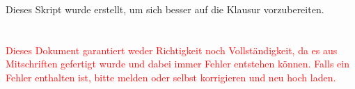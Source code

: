 Dieses Skript wurde erstellt, um sich besser auf die Klausur vorzubereiten.\\
\qquad\\
\qquad\\
\textcolor{red}{\Large{Dieses Dokument garantiert weder Richtigkeit noch Vollständigkeit, da es aus Mitschriften gefertigt wurde und dabei immer Fehler entstehen können. Falls ein Fehler enthalten ist, bitte melden oder selbst korrigieren und neu hoch laden.}}

